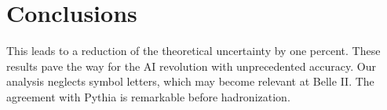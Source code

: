 \section{Conclusions}\label{sec:conclusions}

This leads to a reduction of the theoretical uncertainty by one percent.
These results pave the way for the AI revolution with unprecedented
accuracy. Our analysis neglects symbol letters, which may become
relevant at Belle II. The agreement with Pythia is remarkable before
hadronization.


